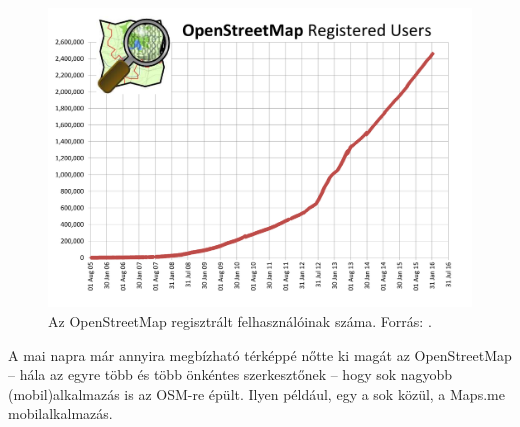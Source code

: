 \documentclass[a4paper,12pt]{report}
\begin{document}
\begin{figure}[h]
\centerline{
\includegraphics[width=5in]{img/osmusers}}
\caption{Az OpenStreetMap regisztrált felhasználóinak száma. Forrás: \cite{osmhistory}.}
\label{osmusers}
\end{figure}

A mai napra már annyira megbízható térképpé nőtte ki magát az OpenStreetMap -- hála az egyre több és több önkéntes szerkesztőnek -- hogy sok nagyobb (mobil)alkalmazás is az OSM-re épült. Ilyen például, egy a sok közül, a Maps.me \cite{mapsme} mobilalkalmazás.
\end{document}

